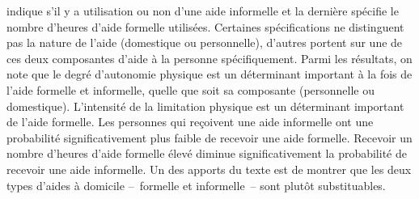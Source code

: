 \begin{Article}
\begin{refsection}[Intro]
indique s'il y a utilisation ou non d'une aide informelle et la
dernière spécifie le nombre d'heures d'aide formelle utilisées.
Certaines spécifications ne distinguent pas la nature de l'aide
(domestique ou personnelle), d'autres portent sur une de ces deux
composantes d'aide à la personne spécifiquement. Parmi les résultats, on
note que le degré d'autonomie physique est un déterminant important à la
fois de l'aide formelle et informelle, quelle que soit sa composante
(personnelle ou domestique). L'intensité de la limitation physique est
un déterminant important de l'aide formelle. Les personnes qui reçoivent
une aide informelle ont une probabilité significativement plus faible de
recevoir une aide formelle. Recevoir un nombre d'heures d'aide formelle
élevé diminue significativement la probabilité de recevoir une aide
informelle. Un des apports du texte est de montrer que les deux types
d'aides à domicile --~formelle et informelle~-- sont plutôt substituables.

\medskip


\end{refsection}
\end{Article}
